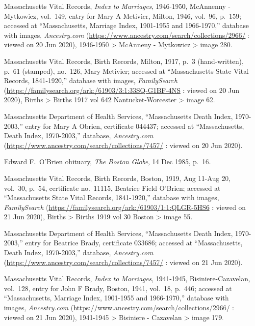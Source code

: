 \begin{thebibliography}{999}
Massachusetts Vital Records, \textit{Index to Marriages}, 1946-1950, McAnnenny - Mytkowicz, vol.\ 149, entry for Mary A Metivier, Milton, 1946, vol.\ 96, p.\ 159; accessed at ``Massachusetts, Marriage Index, 1901-1955 and 1966-1970,'' database with images, \textit{Ancestry.com} (\url{https://www.ancestry.com/search/collections/2966/} : viewed on 20 Jun 2020), 1946-1950 > McAnneny - Mytkowicz > image 280.

Massachusetts Vital Records, Birth Records, Milton, 1917, p.\ 3 (hand-written), p.\ 61 (stamped), no.\ 126, Mary Metivier; accessed at ``Massachusetts State Vital Records, 1841-1920,'' database with images, \textit{FamilySearch} (\url{https://familysearch.org/ark:/61903/3:1:33SQ-G1BF-4NS} : viewed on 20 Jun 2020), Births > Births 1917 vol 642 Nantucket-Worcester > image 62.

Massachusetts Department of Health Services, ``Massachusetts Death Index, 1970-2003,'' entry for Mary A Obrien, certificate 044437; accessed at ``Massachusetts, Death Index, 1970-2003,'' database, \textit{Ancestry.com} (\url{https://www.ancestry.com/search/collections/7457/} : viewed on 20 Jun 2020).

Edward F.\ O'Brien obituary, \textit{The Boston Globe}, 14 Dec 1985, p.\ 16.


Massachusetts Vital Records, Birth Records, Boston, 1919, Aug 11-Aug 20, vol.\ 30, p.\ 54, certificate no.\ 11115, Beatrice Field O'Brien; accessed at ``Massachusetts State Vital Records, 1841-1920,'' database with images, \textit{FamilySearch} (\url{https://familysearch.org/ark:/61903/1:1:QLGR-5HS6} : viewed on 21 Jun 2020), Births > Births 1919 vol 30 Boston > image 55.

Massachusetts Department of Health Services, ``Massachusetts Death Index, 1970-2003,'' entry for Beatrice Brady, certificate 033686; accessed at ``Massachusetts, Death Index, 1970-2003,'' database, \textit{Ancestry.com} (\url{https://www.ancestry.com/search/collections/7457/} : viewed on 21 Jun 2020).

Massachusetts Vital Records, \textit{Index to Marriages}, 1941-1945, Bisiniere-Cazavelan, vol.\ 128, entry for John F Brady, Boston, 1941, vol.\ 18, p.\ 446; accessed at ``Massachusetts, Marriage Index, 1901-1955 and 1966-1970,'' database with images, \textit{Ancestry.com} (\url{https://www.ancestry.com/search/collections/2966/} : viewed on 21 Jun 2020), 1941-1945 > Bisiniere - Cazavelan > image 179.


\end{thebibliography}
